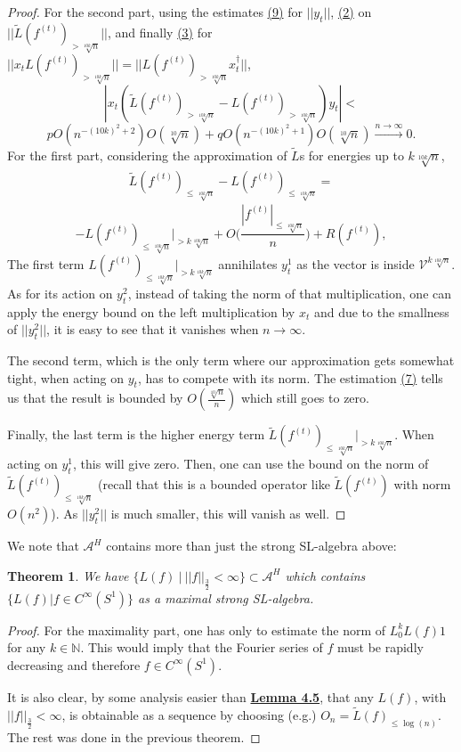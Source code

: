 \documentclass[twoside,11pt,titlepage]{amsart}
\renewcommand{\=}[1]{\stackrel{#1}{=}} %
\newtheorem{thm}{Theorem}[section]
\theoremstyle{definition}
\theoremstyle{remark}
\begin{document}
\begin{proof}
For the second part, using the estimates \hyperref[eq9]{(9)} for $||y_t||$, \hyperref[eq2]{(2)} on $||\widetilde{L}(f^{(t)})_{>\sqrt[10k]{n}}||$, and finally \hyperref[eq3]{(3)} for $||x_tL(f^{(t)})_{>\sqrt[10k]{n}}||=||L(f^{(t)})_{>\sqrt[10k]{n}}x_t^\dagger||$,
$$ |x_t(\widetilde{L}(f^{(t)})_{>\sqrt[10k]{n}}-L(f^{(t)})_{>\sqrt[10k]{n}})y_t|<$$
$$pO(n^{-(10k)^2+2})O(\sqrt[10]{n})+ qO(n^{-(10k)^2+1})O(\sqrt[10]{n}) \xrightarrow{n \to \infty} 0.$$
For the first part, considering the approximation of $\widetilde{L}$s for energies up to $k\sqrt[10k]{n}$,
\begin{align}\label{eq10}
\widetilde{L}(f^{(t)})_{\le \sqrt[10k]{n}}-L(f^{(t)})_{\le \sqrt[10k]{n}}=
\end{align}
$$-L(f^{(t)})_{\le \sqrt[10k]{n}}\Big|_{>k\sqrt[10k]{n}}+O\Big(\frac{|f^{(t)}|_{\le \sqrt[10k]{n}}}{n} \Big)+R(f^{(t)}),$$
The first term $L(f^{(t)})_{\le \sqrt[10k]{n}}|_{>k\sqrt[10k]{n}}$ annihilates $y_t^1$ as the vector is inside $\mathcal{V}^{k\sqrt[10k]{n}}$. As for its action on $y_t^2$, instead of taking the norm of that multiplication, one can apply the energy bound on the left multiplication by $x_t$ and due to the smallness of $||y_t^2||$, it is easy to see that it vanishes when $n \to \infty$.

The second term, which is the only term where our approximation gets somewhat tight, when acting on $y_t$, has to compete with its norm. The estimation \hyperref[eq7]{(7)} tells us that the result is bounded by $O(\frac{\sqrt[10]{n}}{n})$ which still goes to zero.

Finally, the last term is the higher energy term $\widetilde{L}(f^{(t)})_{\le \sqrt[10k]{n}}|_{> k\sqrt[10k]{n}}$. When acting on $y_t^1$, this will give zero. Then, one can use the bound on the norm of $\widetilde{L}(f^{(t)})_{\le \sqrt[10k]{n}}$ (recall that this is a bounded operator like $\widetilde{L}(f^{(t)})$ with norm $O(n^2)$). As $||y_t^2||$ is much smaller, this will vanish as well.
\end{proof}
We note that $\mathcal{A}^H$ contains more than just the strong SL-algebra above:
\begin{thm}\label{thm4.7}
We have $\{L(f) \ | \ ||f||_{\frac{3}{2}}<\infty \} \subset \mathcal{A}^H$ which contains $\{L(f) | f \in C^{\infty}(S^1)\}$ as a maximal strong SL-algebra.
\end{thm}
\begin{proof}
For the maximality part, one has only to estimate the norm of $L_0^kL(f)1$ for any $k \in \mathbb{N}$. This would imply that the Fourier series of $f$ must be rapidly decreasing and therefore $f \in C^{\infty}(S^1)$.

It is also clear, by some analysis easier than \hyperref[lem4.5]{\textbf{Lemma 4.5}}, that any $L(f)$, with $||f||_{\frac{3}{2}}<\infty $, is obtainable as a sequence by choosing (e.g.) $O_n=\widetilde{L}(f)_{\le \log(n)}$. The rest was done in the previous theorem.
\end{proof}
\end{document}
